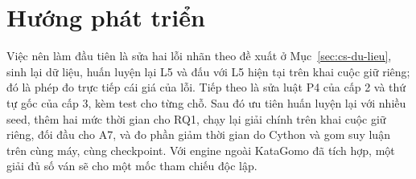 \section{Hướng phát triển}
Việc nên làm đầu tiên là sửa hai lỗi nhãn theo đề xuất ở Mục~\ref{sec:cs-du-lieu}, sinh lại dữ liệu, huấn luyện lại L5 và
đấu với L5 hiện tại trên khai cuộc giữ riêng; đó là phép đo trực tiếp cái giá của lỗi. Tiếp theo là sửa luật P4 của cấp 2 và thứ tự gốc của
cấp 3, kèm test cho từng chỗ. Sau đó ưu tiên huấn luyện lại với nhiều seed, thêm hai mức thời gian cho RQ1, chạy lại giải chính trên khai cuộc giữ riêng, đối đầu cho A7, và đo phần giảm thời gian do Cython và gom suy luận trên cùng máy, cùng checkpoint. Với engine ngoài KataGomo đã tích hợp, một giải đủ số ván sẽ cho một mốc tham chiếu độc lập.
